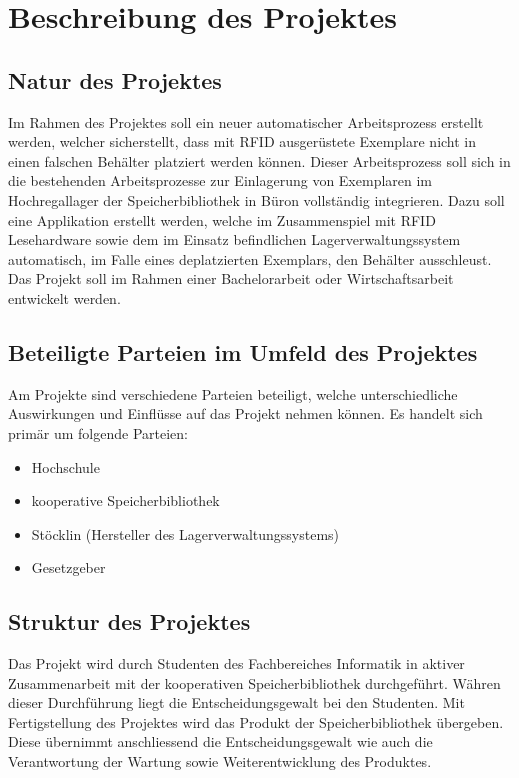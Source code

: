 \chapter{Beschreibung des Projektes}

\section{Natur des Projektes}
Im Rahmen des Projektes soll ein neuer automatischer Arbeitsprozess erstellt werden, welcher sicherstellt, dass mit RFID ausgerüstete Exemplare nicht in einen falschen Behälter platziert werden können. Dieser Arbeitsprozess soll sich in die bestehenden Arbeitsprozesse zur Einlagerung von Exemplaren im Hochregallager der Speicherbibliothek in Büron vollständig integrieren. Dazu soll eine Applikation erstellt werden, welche im Zusammenspiel mit RFID Lesehardware sowie dem im Einsatz befindlichen Lagerverwaltungssystem automatisch, im Falle eines deplatzierten Exemplars, den Behälter ausschleust. Das Projekt soll im Rahmen einer Bachelorarbeit oder Wirtschaftsarbeit entwickelt werden.

\section{Beteiligte Parteien im Umfeld des Projektes}
Am Projekte sind verschiedene Parteien beteiligt, welche unterschiedliche Auswirkungen und Einflüsse auf das Projekt nehmen können. Es handelt sich primär um folgende Parteien:
\begin{itemize}
	\item Hochschule
	\item kooperative Speicherbibliothek
	\item Stöcklin (Hersteller des Lagerverwaltungssystems)
	\item Gesetzgeber
\end{itemize}

\section{Struktur des Projektes}
Das Projekt wird durch Studenten des Fachbereiches Informatik in aktiver Zusammenarbeit mit der kooperativen Speicherbibliothek durchgeführt. Währen dieser Durchführung liegt die Entscheidungsgewalt bei den Studenten. Mit Fertigstellung des Projektes wird das Produkt der Speicherbibliothek übergeben. Diese übernimmt anschliessend die Entscheidungsgewalt wie auch die Verantwortung der Wartung sowie Weiterentwicklung des Produktes.

